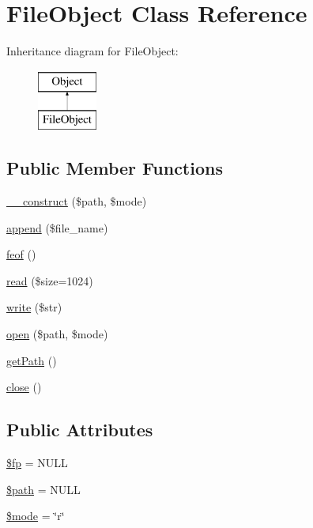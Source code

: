 \hypertarget{classFileObject}{\section{File\-Object Class Reference}
\label{classFileObject}
}
Inheritance diagram for File\-Object\-:\begin{figure}[H]
\begin{center}
\leavevmode
\includegraphics[height=2.000000cm]{classFileObject}
\end{center}
\end{figure}
\subsection*{Public Member Functions}
\begin{DoxyCompactItemize}
\item 
\hyperlink{classFileObject_ace5800d0760a871cc61f0de34b7937ff}{\-\_\-\-\_\-construct} (\$path, \$mode)
\item 
\hyperlink{classFileObject_add062e05a5efc8c4c5947cbf3ff120a7}{append} (\$file\-\_\-name)
\item 
\hyperlink{classFileObject_a83ecf26332ee98598e0d45cae59b8e63}{feof} ()
\item 
\hyperlink{classFileObject_af345fcd2d619a3e13b1f95f744964617}{read} (\$size=1024)
\item 
\hyperlink{classFileObject_a6bfe97d0df5b57183c0816fb013b7fb2}{write} (\$str)
\item 
\hyperlink{classFileObject_af54e058c79d19dca6ef4c6e2bb54831f}{open} (\$path, \$mode)
\item 
\hyperlink{classFileObject_a3c8f4eff2c65c91f6ae36bb57ab332c5}{get\-Path} ()
\item 
\hyperlink{classFileObject_a14dcc624814271fb3f91a2a20a23ab24}{close} ()
\end{DoxyCompactItemize}
\subsection*{Public Attributes}
\begin{DoxyCompactItemize}
\item 
\hyperlink{classFileObject_a3b4c55272cc7ab0a4e7e79aec6ebfbac}{\$fp} = N\-U\-L\-L
\item 
\hyperlink{classFileObject_aeaea5fd423f0c1349ad151f7da63f0e8}{\$path} = N\-U\-L\-L
\item 
\hyperlink{classFileObject_aa4cff8a1b117de6986c0765ae2284dab}{\$mode} = \char`\"{}r\char`\"{}
\end{DoxyCompactItemize}


